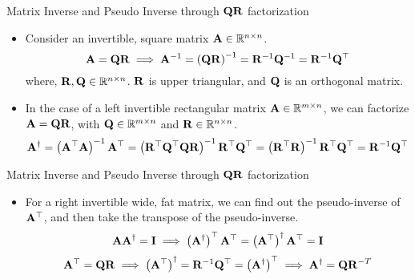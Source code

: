 \documentclass[aspectratio=169]{beamer}
\let\olditem\item
\renewcommand{\item}{\setlength{\itemsep}{\fill}\olditem}
\def\mf{\ensuremath\mathbf}
\def\mb{\ensuremath\mathbb}
\def\lV{\ensuremath\left\lVert}
\def\rV{\ensuremath\right\rVert}
\begin{document}






\begin{frame}[t]{Matrix Inverse and Pseudo Inverse through $\mf{QR}$ factorization}
\begin{itemize}
    \item Consider an invertible, square matrix $\mf{A} \in \mb{R}^{n \times n}$. 
    \[ \mf{A} = \mf{QR} \implies \mf{A}^{-1} = \left(\mf{QR}\right)^{-1} = \mf{R}^{-1}\mf{Q}^{-1} = \mf{R}^{-1}\mf{Q}^\top \] 
    where, $\mf{R}, \mf{Q} \in \mb{R}^{n \times n}$. $\mf{R}$ is upper triangular, and $\mf{Q}$ is an orthogonal matrix.
    
    \item In the case of a left invertible rectangular matrix $\mf{A} \in \mb{R}^{m \times n}$, we can factorize $\mf{A} = \mf{QR}$, with $\mf{Q} \in \mb{R}^{m \times n}$ and $\mf{R} \in \mb{R}^{n \times n}$.
    \[ \mf{A}^{\dagger} = \left(\mf{A}^\top\mf{A}\right)^{-1}\mf{A}^\top = \left(\mf{R}^\top\mf{Q}^\top\mf{QR}\right)^{-1}\mf{R}^\top\mf{Q}^\top = \left(\mf{R}^\top\mf{R}\right)^{-1}\mf{R}^\top\mf{Q}^\top = \mf{R}^{-1}\mf{Q}^\top \]
\end{itemize}
\end{frame}


\begin{frame}[t]{Matrix Inverse and Pseudo Inverse through $\mf{QR}$ factorization}
\begin{itemize}
    \item For a right invertible wide, fat matrix, we can find out the pseudo-inverse of $\mf{A}^\top$, and then take the transpose of the pseudo-inverse.
    \[ \mf{AA}^{\dagger} = \mf{I} \implies \left(\mf{A}^{\dagger}\right)^\top\mf{A}^\top = \left(\mf{A}^\top\right)^{\dagger}\mf{A}^\top = \mf{I} \]
    \[ \mf{A}^\top = \mf{QR} \implies \left(\mf{A}^\top\right)^{\dagger} = \mf{R}^{-1}\mf{Q}^\top = \left(\mf{A}^{\dagger}\right)^\top \implies  \mf{A}^{\dagger} = \mf{QR}^{-T} \]
\end{itemize}
\end{frame}
\end{document}
